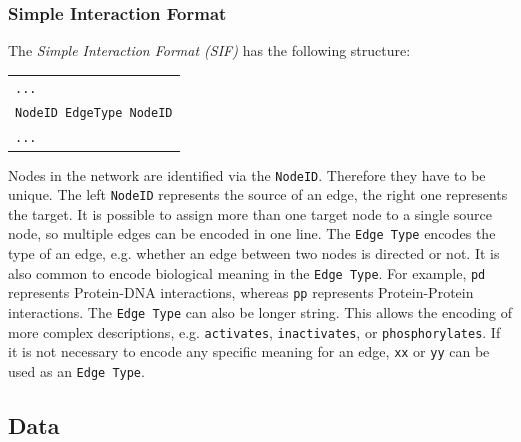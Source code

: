 \subsubsection{Simple Interaction Format}
\label{subsection:sif}
The \textit{Simple Interaction Format (SIF)} has the following structure:
\begin{center}
\begin{tabular}{l}
 \texttt{...}
 \\\texttt{NodeID	EdgeType	NodeID}
 \\\texttt{...}
\end{tabular}
\end{center}
\noindent
Nodes in the network are identified via the \texttt{NodeID}. Therefore they have to be unique. 
The left \texttt{NodeID} represents the source of an edge, the right one represents the target. 
It is possible to assign more than one target node to a single source node, so multiple edges can be encoded in one line. 
The \texttt{Edge Type} encodes the type of an edge, e.g. whether an edge between two nodes is directed or not. It is also common to encode biological meaning in the \texttt{Edge Type}.
For example, \texttt{pd} represents Protein-DNA interactions, whereas \texttt{pp} represents Protein-Protein interactions. 
The \texttt{Edge Type} can also be longer string. This allows the encoding of more complex descriptions, e.g. \texttt{activates}, \texttt{inactivates}, or \texttt{phosphorylates}.
If it is not necessary to encode any specific meaning for an edge, \texttt{xx} or \texttt{yy} can be used as an \texttt{Edge Type}.

\subsection{Data}

